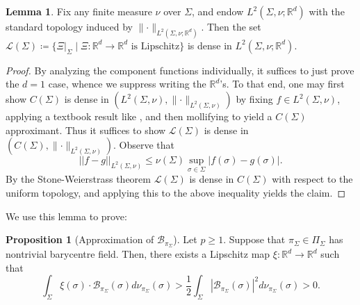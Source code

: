 \documentclass[preprint, reqno]{amsart}
\theoremstyle{definition}
\newtheorem{lemma}[definition]{Lemma}
\newtheorem{proposition}[definition]{Proposition}
\numberwithin{equation}{section}
\begin{document}
\begin{lemma}\label{lemma:lipschitzdense}
  Fix any finite measure $\nu$ over $\Sigma$, and endow $L^2(\Sigma,
  \nu; \mathbb{R}^d)$ with the standard topology induced by $\lVert
  \cdot \rVert_{L^2(\Sigma, \nu; \mathbb{R}^d)}$. Then the set
  $\mathcal{L}(\Sigma) \coloneqq \{\Xi|_{\Sigma} \mid \Xi:
  \mathbb{R}^d \to \mathbb{R}^d \text{ is Lipschitz} \}$ is dense in
  $L^2(\Sigma, \nu; \mathbb{R}^d)$.
\end{lemma}
\begin{proof}
  By analyzing the component functions individually, it suffices to
  just prove the $d=1$ case, whence we suppress writing the $\mathbb
  R^d$'s. To that end, one may first show $C(\Sigma)$ is dense in
  $(L^2(\Sigma, \nu), \lVert \cdot \rVert_{L^2(\Sigma, \nu)})$ by
  fixing $f \in L^2(\Sigma, \nu)$, applying a textbook result like
  \cite[Proposition 6.7]{folland}, and then mollifying to yield a
  $C(\Sigma)$ approximant. Thus it suffices to show
  $\mathcal{L}(\Sigma)$ is dense in $(C(\Sigma), \lVert \cdot
  \rVert_{L^2(\Sigma,\nu)})$. Observe that
  \[
    ||f - g||_{L^2(\Sigma, \nu)} \leq \nu(\Sigma)\sup_{\sigma\in
      \Sigma}|f(\sigma) - g(\sigma)|.
  \]
  By the Stone-Weierstrass theorem $\mathcal{L}(\Sigma)$ is dense in
  $C(\Sigma)$ with respect to the uniform topology, and applying this
  to the above inequality yields the claim.
\end{proof}
We use this lemma to prove:
\begin{proposition}[Approximation of
  $\mathcal{B}_{\pi_{\Sigma}}$]\label{approximatebysmooth}
  Let $p \geq 1$. Suppose that $\pi_{\Sigma} \in \Pi_\Sigma$ has
  nontrivial barycentre field. Then, there exists a Lipschitz map $\xi
  : \mathbb{R}^d \to \mathbb{R}^d$ such that
  \[
    \int_{\Sigma} \xi(\sigma) \cdot
    \mathcal{B}_{\pi_{\Sigma}}(\sigma) d \nu_{\pi_{\Sigma}}(\sigma) >
    \frac{1}{2}\int_{\Sigma}|\mathcal{B}_{\pi_{\Sigma}}(\sigma) |^2 d
    \nu_{\pi_{\Sigma}}(\sigma) > 0.
  \]
\end{proposition}
\end{document}
